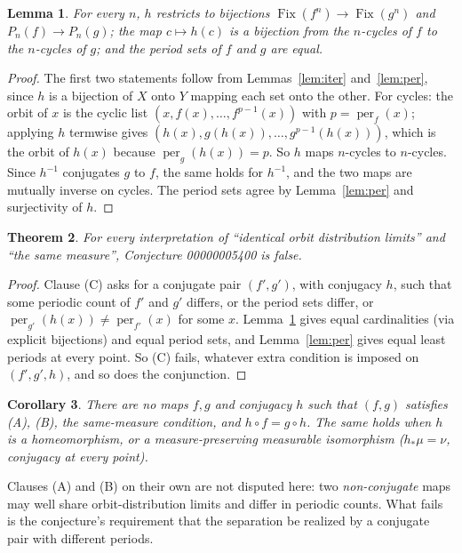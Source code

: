 \documentclass[11pt]{article}
\newtheorem{theorem}{Theorem}
\newtheorem{lemma}[theorem]{Lemma}
\newtheorem{corollary}[theorem]{Corollary}
\theoremstyle{definition}
\theoremstyle{remark}
\renewcommand{\_}{\oldus\allowbreak}
\newcommand{\Fix}{\operatorname{Fix}}
\newcommand{\per}{\operatorname{per}}
\begin{document}
\begin{lemma}\label{lem:bij}
For every $n$, $h$ restricts to bijections $\Fix(f^n)\to\Fix(g^n)$ and $P_n(f)\to P_n(g)$; the map
$c\mapsto h(c)$ is a bijection from the $n$-cycles of $f$ to the $n$-cycles of $g$; and the period
sets of $f$ and $g$ are equal.
\end{lemma}
\begin{proof}
The first two statements follow from Lemmas~\ref{lem:iter} and~\ref{lem:per}, since $h$ is a bijection
of $X$ onto $Y$ mapping each set onto the other. For cycles: the orbit of $x$ is the cyclic list
$(x,f(x),\dots,f^{p-1}(x))$ with $p=\per_f(x)$; applying $h$ termwise gives
$(h(x),g(h(x)),\dots,g^{p-1}(h(x)))$, which is the orbit of $h(x)$ because $\per_g(h(x))=p$. So $h$ maps
$n$-cycles to $n$-cycles. Since $h^{-1}$ conjugates $g$ to $f$, the same holds for $h^{-1}$, and the two
maps are mutually inverse on cycles. The period sets agree by Lemma~\ref{lem:per} and surjectivity of $h$.
\end{proof}

\begin{theorem}\label{thm:main}
For every interpretation of ``identical orbit distribution limits'' and ``the same measure'',
Conjecture 00000005400 is false.
\end{theorem}
\begin{proof}
Clause (C) asks for a conjugate pair $(f',g')$, with conjugacy $h$, such that some periodic count of
$f'$ and $g'$ differs, or the period sets differ, or $\per_{g'}(h(x))\ne\per_{f'}(x)$ for some $x$.
Lemma~\ref{lem:bij} gives equal cardinalities (via explicit bijections) and equal period sets, and
Lemma~\ref{lem:per} gives equal least periods at every point. So (C) fails, whatever extra condition is
imposed on $(f',g',h)$, and so does the conjunction.
\end{proof}

\begin{corollary}\label{cor:same}
There are no maps $f,g$ and conjugacy $h$ such that $(f,g)$ satisfies (A), (B), the same-measure
condition, and $h\circ f=g\circ h$. The same holds when $h$ is a homeomorphism, or a measure-preserving
measurable isomorphism ($h_*\mu=\nu$, conjugacy at every point).
\end{corollary}

Clauses (A) and (B) on their own are not disputed here: two \emph{non-conjugate} maps may well share
orbit-distribution limits and differ in periodic counts. What fails is the conjecture's requirement
that the separation be realized by a conjugate pair with different periods.
\end{document}
